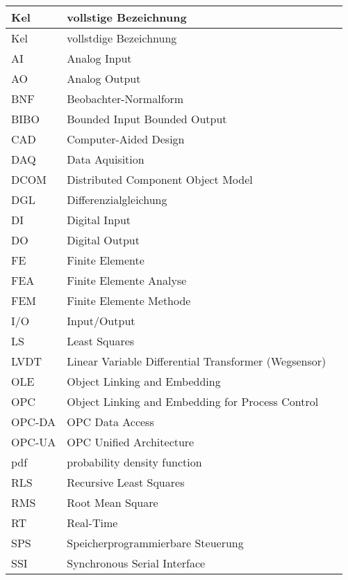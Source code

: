 \begin{longtable}{@{}l@{\qquad}X@{\quad}p{18mm}}
\toprule
Kel 	& vollstige Bezeichnung\\ \midrule
\endfirsthead
\toprule
Kel & vollstdige Bezeichnung\\ \midrule
\endhead

AI & Analog Input\\
AO & Analog Output\\
BNF & Beobachter-Normalform\\
BIBO & Bounded Input Bounded Output\\
CAD & Computer-Aided Design\\
DAQ & Data Aquisition\\
DCOM & Distributed Component Object Model\\
DGL & Differenzialgleichung\\
DI & Digital Input\\
DO & Digital Output\\
FE & Finite Elemente\\
FEA & Finite Elemente Analyse\\
FEM & Finite Elemente Methode\\
I/O & Input/Output\\
LS & Least Squares\\
LVDT & Linear Variable Differential Transformer (Wegsensor)\\
OLE & Object Linking and Embedding\\
OPC & Object Linking and Embedding for Process Control\\
OPC-DA & OPC Data Access\\
OPC-UA & OPC Unified Architecture\\
pdf & probability density function\\
RLS & Recursive Least Squares\\
RMS & Root Mean Square\\
RT & Real-Time\\
SPS & Speicherprogrammierbare Steuerung\\
SSI & Synchronous Serial Interface\\

\end{longtable}